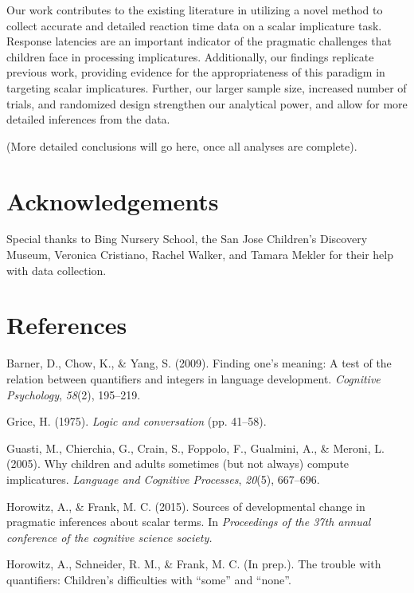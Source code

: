 \documentclass[10pt, letterpaper]{article}
\begin{document}
Our work contributes to the existing literature in utilizing a novel
method to collect accurate and detailed reaction time data on a scalar
implicature task. Response latencies are an important indicator of the
pragmatic challenges that children face in processing implicatures.
Additionally, our findings replicate previous work, providing evidence
for the appropriateness of this paradigm in targeting scalar
implicatures. Further, our larger sample size, increased number of
trials, and randomized design strengthen our analytical power, and allow
for more detailed inferences from the data.

(More detailed conclusions will go here, once all analyses are
complete).

\section{Acknowledgements}\label{acknowledgements}

Special thanks to Bing Nursery School, the San Jose Children's Discovery
Museum, Veronica Cristiano, Rachel Walker, and Tamara Mekler for their
help with data collection.

\section{References}\label{references}

\setlength{\parindent}{-0.1in} \setlength{\leftskip}{0.125in} \noindent

Barner, D., Chow, K., \& Yang, S. (2009). Finding one's meaning: A test
of the relation between quantifiers and integers in language
development. \emph{Cognitive Psychology}, \emph{58}(2), 195--219.

Grice, H. (1975). \emph{Logic and conversation} (pp. 41--58).

Guasti, M., Chierchia, G., Crain, S., Foppolo, F., Gualmini, A., \&
Meroni, L. (2005). Why children and adults sometimes (but not always)
compute implicatures. \emph{Language and Cognitive Processes},
\emph{20}(5), 667--696.

Horowitz, A., \& Frank, M. C. (2015). Sources of developmental change in
pragmatic inferences about scalar terms. In \emph{Proceedings of the
37th annual conference of the cognitive science society.}

Horowitz, A., Schneider, R. M., \& Frank, M. C. (In prep.). The trouble
with quantifiers: Children's difficulties with ``some'' and ``none''.
\end{document}
